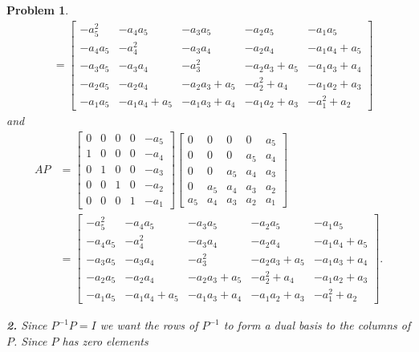 \documentclass{article}
\newcommand{\subno}[1]{\par\noindent\textbf{#1}}
\theoremstyle{pprop}
\newtheorem{problem}{Problem}[section]
\begin{document}
\begin{problem}
\begin{align*}
&=
\left[\begin{matrix}- a_{5}^{2} & - a_{4} a_{5} & - a_{3} a_{5} & - a_{2} a_{5} & - a_{1} a_{5}\\- a_{4} a_{5} & - a_{4}^{2} & - a_{3} a_{4} & - a_{2} a_{4} & - a_{1} a_{4} + a_{5}\\- a_{3} a_{5} & - a_{3} a_{4} & - a_{3}^{2} & - a_{2} a_{3} + a_{5} & - a_{1} a_{3} + a_{4}\\- a_{2} a_{5} & - a_{2} a_{4} & - a_{2} a_{3} + a_{5} & - a_{2}^{2} + a_{4} & - a_{1} a_{2} + a_{3}\\- a_{1} a_{5} & - a_{1} a_{4} + a_{5} & - a_{1} a_{3} + a_{4} & - a_{1} a_{2} + a_{3} & - a_{1}^{2} + a_{2}\end{matrix}\right]
\end{align*}
and
\begin{align*}
AP & =
\left[\begin{matrix}0 & 0 & 0 & 0 & - a_{5}\\1 & 0 & 0 & 0 & - a_{4}\\0 & 1 & 0 & 0 & - a_{3}\\0 & 0 & 1 & 0 & - a_{2}\\0 & 0 & 0 & 1 & - a_{1}\end{matrix}\right]
\left[\begin{matrix}0 & 0 & 0 & 0 & a_{5}\\0 & 0 & 0 & a_{5} & a_{4}\\0 & 0 & a_{5} & a_{4} & a_{3}\\0 & a_{5} & a_{4} & a_{3} & a_{2}\\a_{5} & a_{4} & a_{3} & a_{2} & a_{1}\end{matrix}\right]\\
&=\left[\begin{matrix}- a_{5}^{2} & - a_{4} a_{5} & - a_{3} a_{5} & - a_{2} a_{5} & - a_{1} a_{5}\\- a_{4} a_{5} & - a_{4}^{2} & - a_{3} a_{4} & - a_{2} a_{4} & - a_{1} a_{4} + a_{5}\\- a_{3} a_{5} & - a_{3} a_{4} & - a_{3}^{2} & - a_{2} a_{3} + a_{5} & - a_{1} a_{3} + a_{4}\\- a_{2} a_{5} & - a_{2} a_{4} & - a_{2} a_{3} + a_{5} & - a_{2}^{2} + a_{4} & - a_{1} a_{2} + a_{3}\\- a_{1} a_{5} & - a_{1} a_{4} + a_{5} & - a_{1} a_{3} + a_{4} & - a_{1} a_{2} + a_{3} & - a_{1}^{2} + a_{2}\end{matrix}\right].
\end{align*}
\subno{2.} Since $P^{-1}P=I$ we want the rows of $P^{-1}$ to form a dual basis to the columns of $P$. Since $P$ has zero elements 

\end{problem}
\end{document}
